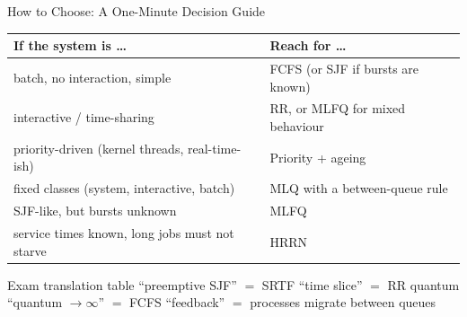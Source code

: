 \documentclass[aspectratio=169]{beamer}
\begin{document}
\begin{frame}{How to Choose: A One-Minute Decision Guide}
  \centering
  \footnotesize
  \renewcommand{\arraystretch}{1.22}
  \begin{tabular}{p{5.3cm}p{6.8cm}}
    \toprule
    \textbf{If the system is \ldots} & \textbf{Reach for \ldots} \\
    \midrule
    batch, no interaction, simple & FCFS (or SJF if bursts are known) \\
    interactive / time-sharing & RR, or MLFQ for mixed behaviour \\
    priority-driven (kernel threads, real-time-ish) & Priority + ageing \\
    fixed classes (system, interactive, batch) & MLQ with a between-queue rule \\
    SJF-like, but bursts unknown & MLFQ \\
    service times known, long jobs must not starve & HRRN \\
    \bottomrule
  \end{tabular}
  \vspace{0.3cm}
  \begin{block}{Exam translation table}
    ``preemptive SJF'' $=$ SRTF \quad\textbullet\quad
    ``time slice'' $=$ RR quantum \quad\textbullet\quad
    ``quantum $\to\infty$'' $=$ FCFS \quad\textbullet\quad
    ``feedback'' $=$ processes migrate between queues
  \end{block}
\end{frame}
\end{document}
